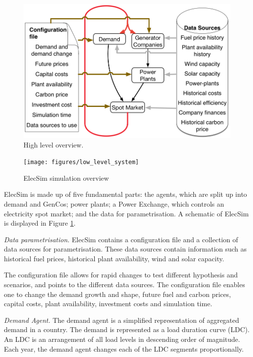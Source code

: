 
\begin{figure}
	\centering
	\includegraphics[width=0.85\linewidth]{figures/System_overview_large.png}
	\caption{High level overview.}
	\label{fig:systemoverview}
	\vskip -6.9mm
\end{figure}

\begin{figure}
	\centering
	\texttt{[image: figures/low\_level\_system]}
	\caption{ElecSim simulation overview}
	\label{fig:lowlevelsystem}
\end{figure}

ElecSim is made up of five fundamental parts: the agents, which are split up into demand and GenCos; power plants; a Power Exchange, which controls an electricity spot market; and the data for parametrisation. A schematic of ElecSim is displayed in Figure \ref{fig:systemoverview}.

\textit{Data parametrisation.} ElecSim contains a configuration file and a collection of data sources for parametrisation. These data sources contain information such as historical fuel prices, historical plant availability, wind and solar capacity.

The configuration file allows for rapid changes to test different hypothesis and scenarios, and points to the different data sources. The configuration file enables one to change the demand growth and shape, future fuel and carbon prices, capital costs, plant availability, investment costs and simulation time.

\textit{Demand Agent.} The demand agent is a simplified representation of aggregated demand in a country. The demand is represented as a load duration curve (LDC).  An LDC is an arrangement of all load levels in descending order of magnitude.  Each year, the demand agent changes each of the LDC segments proportionally.


